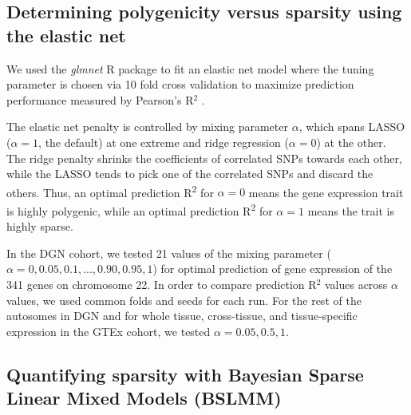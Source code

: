 \documentclass[10pt,letterpaper]{article}
\begin{document}
\subsection*{Determining polygenicity versus sparsity using the elastic
net}\label{determining-polygenicity-versus-sparsity-using-the-elastic-net}

We used the \textit{glmnet} R package to fit an elastic net model where the tuning parameter is chosen via 10 fold cross validation to maximize prediction performance measured by Pearson's R$^2$ \cite{Friedman_2010, Simon_2011}.

The elastic net penalty is controlled by mixing parameter \(\alpha\),
which spans LASSO (\(\alpha=1\), the default) \cite{Tibshirani_1996} at one extreme
and ridge regression (\(\alpha=0\)) \cite{Hoerl_1970} at the other. The ridge
penalty shrinks the coefficients of correlated SNPs towards each other,
while the LASSO tends to pick one of the correlated SNPs and discard the
others. Thus, an optimal prediction R\textsuperscript{2} for
\(\alpha=0\) means the gene expression trait is highly polygenic, while
an optimal prediction R\textsuperscript{2} for \(\alpha=1\) means the
trait is highly sparse. 

In the DGN cohort, we tested 21 values of the mixing parameter
(\(\alpha=0, 0.05, 0.1, ..., 0.90, 0.95, 1\)) for optimal prediction of
gene expression of the 341 genes on chromosome 22. In order to compare prediction R$^2$ values across $\alpha$ values, we used common folds and seeds for each run. For the rest of the
autosomes in DGN and for whole tissue, cross-tissue, and tissue-specific
expression in the GTEx cohort, we tested \(\alpha=0.05, 0.5, 1\).

\subsection*{Quantifying sparsity with Bayesian Sparse Linear Mixed
Models
(BSLMM)}\label{quantifying-sparsity-with-bayesian-sparse-linear-mixed-models-bslmm}
\end{document}
